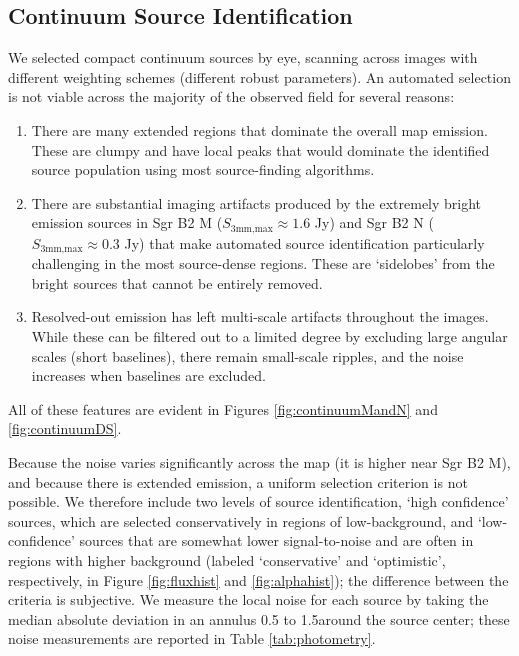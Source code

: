 \documentclass[twocolumn]{aastex61}
\begin{document}
\subsection{Continuum Source Identification}
\label{sec:contsources}
We selected compact continuum  sources by eye,
scanning across images with different weighting schemes (different robust
parameters).  An automated selection is not viable across the majority of the
observed field for several reasons:
\begin{enumerate}
    \item There are many extended \hii regions that dominate the overall map
        emission.  These are clumpy and have local peaks that would dominate
        the identified source population using most source-finding algorithms.
    \item There are substantial imaging artifacts produced by the extremely
        bright emission sources in Sgr B2 M ($S_{3 \textrm{mm,max}} \approx 1.6$ Jy) and
        Sgr B2 N ($S_{3 \textrm{mm,max}} \approx 0.3$ Jy) that make automated source
        identification particularly challenging in the most source-dense
        regions.  These are `sidelobes' from the bright sources that cannot be
        entirely removed.
    \item Resolved-out emission has left multi-scale artifacts throughout the
        images.  While these can be filtered out to a limited degree by
        excluding large angular scales (short baselines), there remain
        small-scale ripples, and the noise increases when baselines are
        excluded.
\end{enumerate}
All of these features are evident in Figures \ref{fig:continuumMandN} and
\ref{fig:continuumDS}. 

Because the noise varies significantly across the map (it is higher near Sgr B2
M), and because there is extended emission, a uniform selection criterion is
not possible.  We therefore include two levels of source identification, `high
confidence' sources, which are selected conservatively in regions of
low-background, and `low-confidence' sources that are somewhat lower
signal-to-noise and are often in regions with higher background (labeled
`conservative' and `optimistic', respectively, in Figure \ref{fig:fluxhist} and
\ref{fig:alphahist}); the difference between the criteria is subjective.  
We measure the local noise for each source by taking the
median absolute deviation in an annulus 0.5 to 1.5\arcsec around the source
center; these noise measurements are reported in Table \ref{tab:photometry}.
\end{document}
